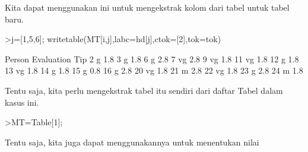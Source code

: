 \documentclass[a4paper,10pt]{article}
\begin{document}
\begin{eulernotebook}
\begin{eulercomment}
\begin{eulercomment}
\begin{eulercomment}
\begin{eulercomment}
\begin{eulercomment}
\begin{eulercomment}
\begin{eulercomment}
\begin{eulercomment}
\begin{eulercomment}
\begin{eulercomment}
\begin{eulercomment}
\begin{eulercomment}
\begin{eulercomment}
\begin{eulercomment}
\begin{eulercomment}
\begin{eulercomment}
\begin{eulercomment}
\begin{eulercomment}
\begin{eulercomment}
\begin{eulercomment}
\begin{eulercomment}
\begin{eulercomment}
\begin{eulercomment}
\begin{eulercomment}
\begin{eulercomment}
\begin{eulercomment}
\begin{eulercomment}
\begin{eulercomment}
\begin{eulercomment}
\begin{eulercomment}
\begin{eulercomment}
\begin{eulercomment}
\begin{eulercomment}
\begin{eulercomment}
\begin{eulercomment}
\begin{eulercomment}
\begin{eulercomment}
\begin{eulercomment}
\begin{eulercomment}
\begin{eulercomment}
\begin{eulercomment}
\begin{eulercomment}
\begin{eulercomment}
\begin{eulercomment}
\begin{eulercomment}
Kita dapat menggunakan ini untuk mengekstrak kolom dari tabel untuk
tabel baru.
\end{eulercomment}
\begin{eulerprompt}
>j=[1,5,6]; writetable(MT[i,j],labc=hd[j],ctok=[2],tok=tok)
\end{eulerprompt}
\begin{euleroutput}
      Person Evaluation       Tip
           2          g       1.8
           3          g       1.8
           6          g       2.8
           7         vg       2.8
           9         vg       1.8
          11         vg       1.8
          12          g       1.8
          13         vg       1.8
          14          g       1.8
          15          g       0.8
          16          g       2.8
          20         vg       1.8
          21          m       2.8
          22         vg       1.8
          23          g       2.8
          24          m       1.8
\end{euleroutput}
\begin{eulercomment}
Tentu saja, kita perlu mengekstrak tabel itu sendiri dari daftar Tabel
dalam kasus ini.
\end{eulercomment}
\begin{eulerprompt}
>MT=Table[1];
\end{eulerprompt}
\begin{eulercomment}
Tentu saja, kita juga dapat menggunakannya untuk menentukan nilai

\end{eulercomment}
\end{eulercomment}
\end{eulercomment}
\end{eulercomment}
\end{eulercomment}
\end{eulercomment}
\end{eulercomment}
\end{eulercomment}
\end{eulercomment}
\end{eulercomment}
\end{eulercomment}
\end{eulercomment}
\end{eulercomment}
\end{eulercomment}
\end{eulercomment}
\end{eulercomment}
\end{eulercomment}
\end{eulercomment}
\end{eulercomment}
\end{eulercomment}
\end{eulercomment}
\end{eulercomment}
\end{eulercomment}
\end{eulercomment}
\end{eulercomment}
\end{eulercomment}
\end{eulercomment}
\end{eulercomment}
\end{eulercomment}
\end{eulercomment}
\end{eulercomment}
\end{eulercomment}
\end{eulercomment}
\end{eulercomment}
\end{eulercomment}
\end{eulercomment}
\end{eulercomment}
\end{eulercomment}
\end{eulercomment}
\end{eulercomment}
\end{eulercomment}
\end{eulercomment}
\end{eulercomment}
\end{eulercomment}
\end{eulercomment}
\end{eulernotebook}
\end{document}
